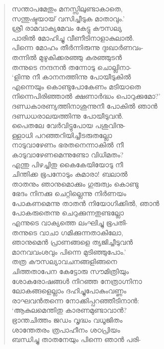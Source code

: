 \begin{verse}
സന്താപമേതും മനസ്സിലുണ്ടാകാതെ,\\
സന്തുഷ്ടയായ് വസിച്ചീടുക മാതാവും.’\\
ശ്രീ രാമവാക്യമേവം കേട്ടു കൗസല്യ\\
പാരില്‍ മോഹിച്ചു വീണീടിനാളാകുലാല്‍.\\
പിന്നെ മോഹം തീര്‍ന്നിരുന്നു ദുഃഖാര്‍ണവം-\\
തന്നില്‍ മുഴുകിക്കരഞ്ഞു കരഞ്ഞുടന്‍\\
തന്നുടെ നന്ദനന്‍ തന്നോടു ചൊല്ലിനാ-\\
‘ളിന്നു നീ കാനനത്തിന്നു പോയീടുകില്‍\\
എന്നെയും കൊണ്ടുപോകേണം മടിയാതെ\\
നിന്നെപിരിഞ്ഞാല്‍ ക്ഷണാര്‍ദ്ധം പൊറുക്കുമോ?’\\
ദണ്ഡകാരണ്യത്തിനാശുന്നുനീ പോകില്‍ ഞാന്‍\\
ദണ്ഡധരാലയത്തിന്നു പോയീടുവന്‍.\\
പൈതലേ വേര്‍വിട്ടുപോയ പശുവിനു-\\
ള്ളാധി പറഞ്ഞറിയിച്ചീടരുതല്ലോ\\
നാടുവാഴേണം ഭരതനെന്നാകില്‍ നീ\\
കാടുവാഴേണമെന്നുണ്ടോ വിധിമതം?\\
എന്തു പിഴച്ചിതു കൈകേയിയോടു നീ\\
ചിന്തിക്ക ഭൂപനോടും കുമാരാ! ബലാല്‍\\
താതനും ഞാനുമൊക്കും ഗുരുത്വം കൊണ്ടു\\
ഭേദം നിനക്കു ചെറ്റില്ലെന്നു നിര്‍ണയം\\
പോകണമെന്നു താതന്‍ നിയോഗിക്കില്‍, ഞാന്‍\\
പോകരുതെന്നു ചെറുക്കുന്നതുണ്ടല്ലോ\\
എന്നുടെ വാക്യത്തെ ലംഘിച്ചു ഭൂപതി-\\
തന്നുടെ വാചാ ഗമിക്കുന്നതാകിലോ,\\
ഞാനുമെന്‍ പ്രാണങ്ങളെ ത്യജിച്ചീടുവന്‍\\
മാനവവംശവും പിന്നെ മുടിഞ്ഞുപോം.’\\
തത്ര കൗസല്യാവചനങ്ങളിങ്ങനെ\\
ചിത്തതാപേന കേട്ടോരു സൗമിത്രിയും\\
ശോകരോഷങ്ങള്‍ നിറഞ്ഞ നേത്രാഗ്നിനാ\\
ലോകങ്ങളെല്ലാം ദഹിച്ചുപോകുംവണ്ണം\\
രാഘവന്‍തന്നെ നോക്കിപ്പറഞ്ഞീടിനാന്‍:\\
‘ആകുലമെന്തിതു കാരണമുണ്ടാവാന്‍?\\
ഭ്രാന്തചിത്തം ജഡം വൃദ്ധം വധൂജിതം\\
ശാന്തേതരം ത്രപാഹീനം ശഠപ്രിയം\\
ബന്ധിച്ചു താതനേയും പിന്നെ ഞാന്‍ പരി-\\

\end{verse}
